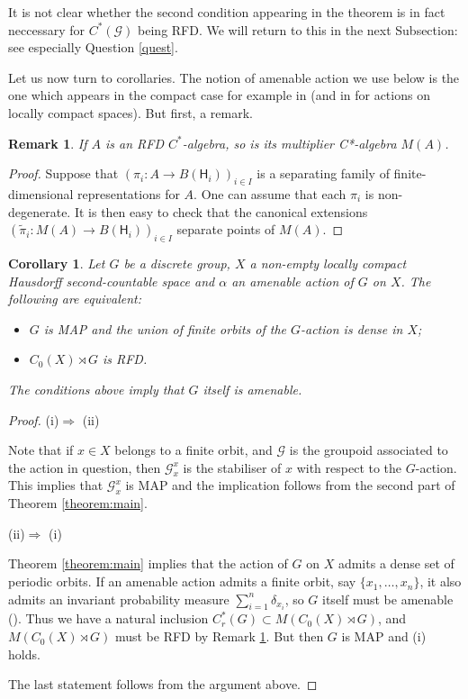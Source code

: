 \documentclass[11 pt, leqno, hidelinks]{amsart}%
\theoremstyle{plain}
\newtheorem{corollary}[theorem]{Corollary}
\newtheorem{remark}[theorem]{Remark}
\numberwithin{equation}{section}
\newcommand{\GG}{\mathcal{G}}
\newcommand{\Hil}{\mathsf{H}}
\begin{document}
It is not clear whether the second condition appearing in the theorem is in fact neccessary for $C^*(\GG)$ being RFD. We will return to this in the next Subsection: see especially Question \ref{quest}.


Let us now turn to corollaries. The notion of amenable action we use below is the one which appears in the compact case for example in  \cite[Section 4.4]{BO}
(and in \cite[Remark 9.17]{Dana} for actions on locally compact spaces). But first, a remark.


\begin{remark}\label{rem:mult}
	If $A$ is an RFD $C^*$-algebra, so is its multiplier C*-algebra $M(A)$.
\end{remark}
\begin{proof}
Suppose that $(\pi_i:A \to B(\Hil_i))_{i \in I}$ is a separating family of finite-dimensional representations for $A$. One can assume that each $\pi_i$ is non-degenerate. It is then easy to check that the canonical extensions $(\tilde{\pi}_i:M(A) \to B(\Hil_i))_{i \in I}$ separate points of $M(A)$.
\end{proof}


\begin{corollary}\label{TransformationGroupoid} Let $G$ be a discrete  group, $X$ a non-empty locally compact  Hausdorff   second-countable space and $\alpha$ an amenable action of $G$ on $X$. The following are equivalent:
	\begin{itemize}
		\item[(i)] $G$ is MAP and the union of finite orbits of the $G$-action is dense in $X$;
		\item[(ii)]  $C_0(X)\rtimes G$ is RFD.
	\end{itemize}
The conditions above  imply that $G$ itself is amenable.
\end{corollary}
\begin{proof}
	
(i)$\Longrightarrow$ (ii)	

Note that if  $x\in X$ belongs to a finite orbit, and $\GG$ is the groupoid associated to the action in question, then $\GG_x^x$ is the stabiliser of $x$ with respect to the $G$-action. This implies that $\GG_x^x$ is MAP and the implication follows from the second part of Theorem \ref{theorem:main}.




(ii)$\Longrightarrow$ (i)

Theorem \ref{theorem:main} implies that the action of $G$ on $X$ admits a dense set of periodic orbits. If an amenable action admits a finite orbit, say $\{x_1, \ldots,x_n\}$, it also admits an invariant probability measure $\sum_{i=1}^n \delta_{x_i}$, so $G$ itself must be amenable (\cite[Exercise 4.4.4]{BO}). Thus we have a natural inclusion $C^*_r (G)\subset M(C_0(X) \rtimes G)$, and $M(C_0(X) \rtimes G)$ must be RFD by Remark \ref{rem:mult}. But then $G$ is MAP and (i) holds.



The last statement follows from the argument above.

\end{proof}
\end{document}
